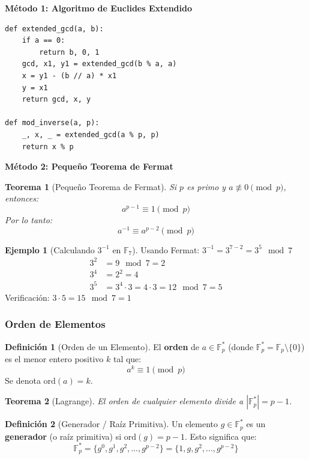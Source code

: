 \documentclass[11pt,a4paper,twoside,openright]{book}
\theoremstyle{definition}
\newtheorem{definition}{Definición}[chapter]
\newtheorem{example}{Ejemplo}[chapter]
\theoremstyle{plain}
\newtheorem{theorem}{Teorema}[chapter]
\theoremstyle{remark}
\begin{document}
\textbf{Método 1: Algoritmo de Euclides Extendido}
\begin{verbatim}
def extended_gcd(a, b):
    if a == 0:
        return b, 0, 1
    gcd, x1, y1 = extended_gcd(b % a, a)
    x = y1 - (b // a) * x1
    y = x1
    return gcd, x, y

def mod_inverse(a, p):
    _, x, _ = extended_gcd(a % p, p)
    return x % p
\end{verbatim}

\textbf{Método 2: Pequeño Teorema de Fermat}
\begin{theorem}[Pequeño Teorema de Fermat]
Si $p$ es primo y $a \not\equiv 0 \pmod{p}$, entonces:
\[ a^{p-1} \equiv 1 \pmod{p} \]
Por lo tanto:
\[ a^{-1} \equiv a^{p-2} \pmod{p} \]
\end{theorem}

\begin{example}[Calculando $3^{-1}$ en $\mathbb{F}_7$]
Usando Fermat: $3^{-1} = 3^{7-2} = 3^5 \mod 7$
\begin{align*}
    3^2 &= 9 \mod 7 = 2 \\
    3^4 &= 2^2 = 4 \\
    3^5 &= 3^4 \cdot 3 = 4 \cdot 3 = 12 \mod 7 = 5
\end{align*}
Verificación: $3 \cdot 5 = 15 \mod 7 = 1$ \checkmark
\end{example}

\subsubsection{Orden de Elementos}

\begin{definition}[Orden de un Elemento]
El \textbf{orden} de $a \in \mathbb{F}_p^*$ (donde $\mathbb{F}_p^* = \mathbb{F}_p \setminus \{0\}$) es el menor entero positivo $k$ tal que:
\[ a^k \equiv 1 \pmod{p} \]
Se denota $\text{ord}(a) = k$.
\end{definition}

\begin{theorem}[Lagrange]
El orden de cualquier elemento divide a $|\mathbb{F}_p^*| = p - 1$.
\end{theorem}

\begin{definition}[Generador / Raíz Primitiva]
Un elemento $g \in \mathbb{F}_p^*$ es un \textbf{generador} (o raíz primitiva) si $\text{ord}(g) = p - 1$. Esto significa que:
\[ \mathbb{F}_p^* = \{g^0, g^1, g^2, \ldots, g^{p-2}\} = \{1, g, g^2, \ldots, g^{p-2}\} \]
\end{definition}
\end{document}

